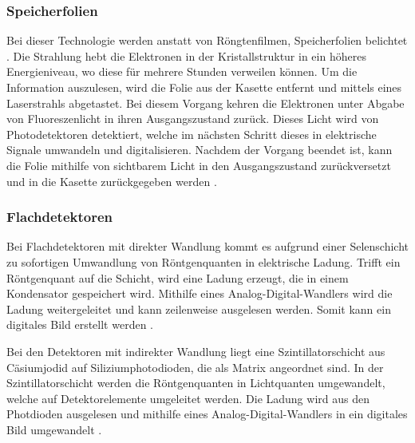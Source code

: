 \subsubsection{Speicherfolien}
\label{subsubsec:Speicherfolien}
Bei dieser Technologie werden anstatt von Röngtenfilmen, Speicherfolien belichtet \cite{MedizinischePhysik}. Die Strahlung hebt die Elektronen in der
Kristallstruktur in ein höheres Energieniveau, wo diese für mehrere Stunden verweilen können. Um die Information auszulesen, wird 
die Folie aus der Kasette entfernt und mittels eines Laserstrahls abgetastet. Bei diesem Vorgang kehren die Elektronen unter
Abgabe von Fluoreszenlicht in ihren Ausgangszustand zurück. Dieses Licht wird von Photodetektoren detektiert, welche
im nächsten Schritt dieses in elektrische Signale umwandeln und digitalisieren. Nachdem der Vorgang beendet ist, kann die Folie 
mithilfe von sichtbarem Licht in den Ausgangszustand zurückversetzt und in die Kasette zurückgegeben werden \cite{Medizintechnik}.


\subsubsection{Flachdetektoren}
\label{subsubsec:Flachdetektoren}

Bei Flachdetektoren mit direkter Wandlung kommt es aufgrund einer Selenschicht zu sofortigen Umwandlung von Röntgenquanten in
elektrische Ladung. Trifft ein Röntgenquant auf die Schicht, wird eine Ladung erzeugt, die in einem Kondensator gespeichert wird. Mithilfe
eines Analog-Digital-Wandlers wird die Ladung weitergeleitet und kann zeilenweise ausgelesen werden. Somit kann ein digitales Bild
erstellt werden \cite{Artikel}. 

Bei den Detektoren mit indirekter Wandlung liegt eine Szintillatorschicht aus Cäsiumjodid auf Siliziumphotodioden, die als Matrix
angeordnet sind. In der Szintillatorschicht werden die Röntgenquanten in Lichtquanten umgewandelt, welche auf Detektorelemente umgeleitet 
werden. Die Ladung wird aus den Photdioden ausgelesen und mithilfe eines Analog-Digital-Wandlers in ein digitales Bild umgewandelt
 \cite{Artikel}.





